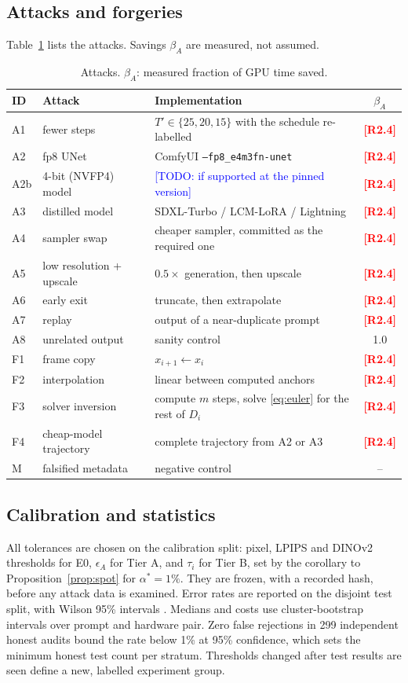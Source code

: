 \documentclass[preprint,review,12pt,authoryear]{elsarticle}
\newcommand{\res}[1]{\textcolor{red}{\textbf{[#1]}}}          %
\newcommand{\todo}[1]{\textcolor{blue}{[TODO: #1]}}            %
\theoremstyle{definition}
\begin{document}
\subsection{Attacks and forgeries}
Table~\ref{tab:attacks} lists the attacks. Savings $\beta_A$ are measured, not assumed.

\begin{table}[t]
\centering\small
\caption{Attacks. $\beta_A$: measured fraction of GPU time saved.}\label{tab:attacks}
\begin{tabularx}{\linewidth}{llXc}
\toprule
ID & Attack & Implementation & $\beta_A$ \\
\midrule
A1 & fewer steps & $T'\in\{25,20,15\}$ with the schedule re-labelled & \res{R2.4} \\
A2 & fp8 UNet & ComfyUI \texttt{--fp8\_e4m3fn-unet} & \res{R2.4} \\
A2b & 4-bit (NVFP4) model & \todo{if supported at the pinned version} & \res{R2.4} \\
A3 & distilled model & SDXL-Turbo / LCM-LoRA / Lightning & \res{R2.4} \\
A4 & sampler swap & cheaper sampler, committed as the required one & \res{R2.4} \\
A5 & low resolution + upscale & $0.5\times$ generation, then upscale & \res{R2.4} \\
A6 & early exit & truncate, then extrapolate & \res{R2.4} \\
A7 & replay & output of a near-duplicate prompt & \res{R2.4} \\
A8 & unrelated output & sanity control & 1.0 \\
F1 & frame copy & $x_{i+1}\leftarrow x_i$ & \res{R2.4} \\
F2 & interpolation & linear between computed anchors & \res{R2.4} \\
F3 & solver inversion & compute $m$ steps, solve \eqref{eq:euler} for the rest of $D_i$ & \res{R2.4} \\
F4 & cheap-model trajectory & complete trajectory from A2 or A3 & \res{R2.4} \\
M & falsified metadata & negative control & -- \\
\bottomrule
\end{tabularx}
\end{table}

\subsection{Calibration and statistics}\label{sec:method-cal}
All tolerances are chosen on the calibration split: pixel, LPIPS and DINOv2 thresholds for E0, $\epsilon_A$ for Tier A, and $\tau_i$ for Tier B, set by the corollary to Proposition~\ref{prop:spot} for $\alpha^\ast=1\%$. They are frozen, with a recorded hash, before any attack data is examined. Error rates are reported on the disjoint test split, with Wilson 95\% intervals \citep{wilson1927}. Medians and costs use cluster-bootstrap intervals over prompt and hardware pair. Zero false rejections in 299 independent honest audits bound the rate below 1\% at 95\% confidence, which sets the minimum honest test count per stratum. Thresholds changed after test results are seen define a new, labelled experiment group.
\end{document}
